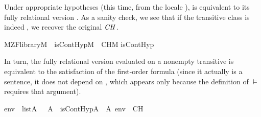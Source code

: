 %
%
Under appropriate hypotheses (this time, from the locale ),
    is equivalent to its fully relational version .
    As a sanity check, we see that if the transitive class is indeed \isa{{\isasymV}},
    we recover the original $\mathit{CH}$.%
\begin{isabelle}%
M{\isacharunderscore}{\kern0pt}ZF{\isacharunderscore}{\kern0pt}library{\isacharparenleft}{\kern0pt}M{\isacharparenright}{\kern0pt}\ {\isasymLongrightarrow}\ is{\isacharunderscore}{\kern0pt}ContHyp{\isacharparenleft}{\kern0pt}M{\isacharparenright}{\kern0pt}\ {\isasymlongleftrightarrow}\ CH\isactrlbsup M\isactrlesup \isasep\isanewline%
is{\isacharunderscore}{\kern0pt}ContHyp{\isacharparenleft}{\kern0pt}{\isasymV}{\isacharparenright}{\kern0pt}\ {\isasymlongleftrightarrow}\ {\isasymaleph}\isactrlesub \ {\isacharequal}{\kern0pt}\ {}\isactrlbsup {\isasymup}{\isasymaleph}\isactrlesub \isactrlesup %
\end{isabelle}%
In turn, the fully relational version evaluated on a nonempty
transitive  is equivalent to the satisfaction of the
first-order formula  (since it
actually is a sentence, it does not depend on , which
appears only because the definition of $\models$ requires that argument).%
\begin{isabelle}%
{\isasymlbrakk}env\ {\isasymin}\ list{\isacharparenleft}{\kern0pt}A{\isacharparenright}{\kern0pt}{\isacharsemicolon}{\kern0pt}\ {}\ {\isasymin}\ A{\isasymrbrakk}\ {\isasymLongrightarrow}\ is{\isacharunderscore}{\kern0pt}ContHyp{\isacharparenleft}{\kern0pt}{\isacharhash}{\kern0pt}{\isacharhash}{\kern0pt}A{\isacharparenright}{\kern0pt}\ {\isasymlongleftrightarrow}\ A{\isacharcomma}{\kern0pt}\ env\ {\isasymTurnstile}\ {\isasymcdot}CH{\isasymcdot}%
\end{isabelle}%
